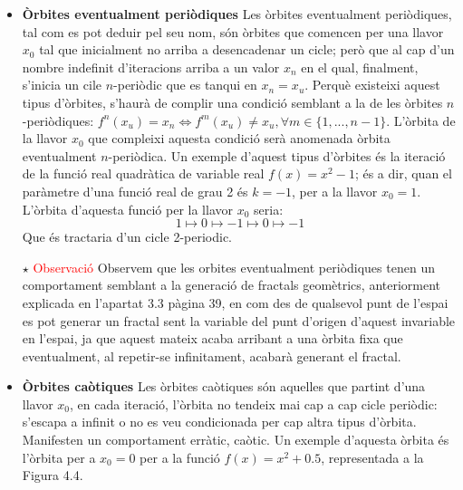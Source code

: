 \documentclass[12pt]{report}
\begin{document}
\begin{itemize}
    \item \textbf{Òrbites eventualment periòdiques}
    \newline
   Les òrbites eventualment periòdiques, tal com es pot deduir pel seu nom, són òrbites que comencen per una llavor $x_0$ tal que inicialment no arriba a desencadenar un cicle; però que al cap d'un nombre indefinit d'iteracions arriba a un valor $x_n$ en el qual, finalment, s'inicia un cile $n$-periòdic que es tanqui en $x_n=x_u$. Perquè existeixi aquest tipus d'òrbites, s'haurà de complir una condició semblant a la de les òrbites $n$-periòdiques: $f^n(x_u)= x_n \Leftrightarrow f^m(x_u) \neq x_u, \forall m \in \{1, ..., n-1\}$. L'òrbita de la llavor $x_0$ que compleixi aquesta condició serà anomenada òrbita eventualment $n$-periòdica.
    \newline 
   Un exemple d'aquest tipus d'òrbites és la iteració de la funció real quadràtica de variable real $f(x)=x^2-1$; és a dir, quan el paràmetre d'una funció real de grau 2 és $k=-1$, per a la llavor $x_0=1$. L'òrbita d'aquesta funció per la llavor $x_0$ seria:
    $$1 \longmapsto 0 \longmapsto -1 \longmapsto 0 \longmapsto -1$$
    Que és tractaria d'un cicle 2-periodic.
    \item [$\star$]\textcolor{red}{Observació}
    \newline
   Observem que les orbites eventualment periòdiques tenen un comportament semblant a la generació de fractals geomètrics, anteriorment explicada en l'apartat 3.3 pàgina 39, en com des de qualsevol punt de l'espai es pot generar un fractal sent la variable del punt d'origen d'aquest invariable en l'espai, ja que aquest mateix acaba arribant a una òrbita fixa que eventualment, al repetir-se infinitament, acabarà generant el fractal.
    \item \textbf{Òrbites caòtiques}
    \newline
   Les òrbites caòtiques són aquelles que partint d'una llavor $x_0$, en cada iteració, l'òrbita no tendeix mai cap a cap cicle periòdic: s'escapa a infinit o no es veu condicionada per cap altra tipus d'òrbita. Manifesten un comportament erràtic, caòtic.
    \newline
    Un exemple d'aquesta òrbita és l'òrbita per a $x_0=0$ per a la funció $f(x)=x^2+0.5$, representada a la Figura 4.4.
\end{itemize}
\end{document}
